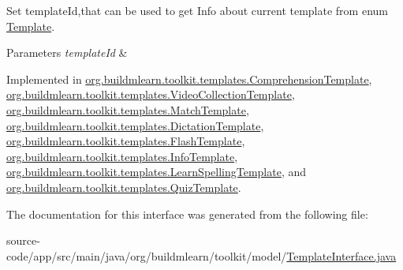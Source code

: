 Set template\+Id,that can be used to get Info about current template from enum \hyperlink{enumorg_1_1buildmlearn_1_1toolkit_1_1model_1_1Template}{Template}. 


\begin{DoxyParams}{Parameters}
{\em template\+Id} & \\
\hline
\end{DoxyParams}


Implemented in \hyperlink{classorg_1_1buildmlearn_1_1toolkit_1_1templates_1_1ComprehensionTemplate_ab4c781e71b5cf6bc8a634571bda8b2d8}{org.\+buildmlearn.\+toolkit.\+templates.\+Comprehension\+Template}, \hyperlink{classorg_1_1buildmlearn_1_1toolkit_1_1templates_1_1VideoCollectionTemplate_a4ddf0868eaa350d857aad69a07d0b93b}{org.\+buildmlearn.\+toolkit.\+templates.\+Video\+Collection\+Template}, \hyperlink{classorg_1_1buildmlearn_1_1toolkit_1_1templates_1_1MatchTemplate_a4a85b3025db0c0f1f445818f47d914be}{org.\+buildmlearn.\+toolkit.\+templates.\+Match\+Template}, \hyperlink{classorg_1_1buildmlearn_1_1toolkit_1_1templates_1_1DictationTemplate_a84d3d92657a1912cac61fa57083442e0}{org.\+buildmlearn.\+toolkit.\+templates.\+Dictation\+Template}, \hyperlink{classorg_1_1buildmlearn_1_1toolkit_1_1templates_1_1FlashTemplate_a4d44f233e7bd0b4d480583c1e3aa2d18}{org.\+buildmlearn.\+toolkit.\+templates.\+Flash\+Template}, \hyperlink{classorg_1_1buildmlearn_1_1toolkit_1_1templates_1_1InfoTemplate_adfce9a41f5acc3f93b638835f7f00f9f}{org.\+buildmlearn.\+toolkit.\+templates.\+Info\+Template}, \hyperlink{classorg_1_1buildmlearn_1_1toolkit_1_1templates_1_1LearnSpellingTemplate_a14326fcdc8ba61fc65172a4ad06b7012}{org.\+buildmlearn.\+toolkit.\+templates.\+Learn\+Spelling\+Template}, and \hyperlink{classorg_1_1buildmlearn_1_1toolkit_1_1templates_1_1QuizTemplate_a588fb1cbd0659ac8ebda7b7835b7ba9c}{org.\+buildmlearn.\+toolkit.\+templates.\+Quiz\+Template}.



The documentation for this interface was generated from the following file\+:\begin{DoxyCompactItemize}
\item 
source-\/code/app/src/main/java/org/buildmlearn/toolkit/model/\hyperlink{TemplateInterface_8java}{Template\+Interface.\+java}\end{DoxyCompactItemize}
